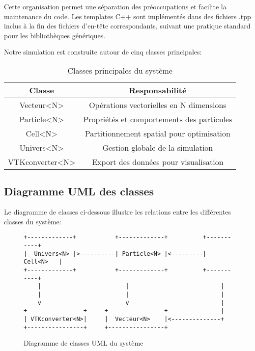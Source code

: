\documentclass[12pt,a4paper]{article}
\begin{document}
Cette organisation permet une séparation des préoccupations et facilite la maintenance du code. Les templates C++ sont implémentés dans des fichiers .tpp inclus à la fin des fichiers d'en-tête correspondants, suivant une pratique standard pour les bibliothèques génériques.

Notre simulation est construite autour de cinq classes principales:

\begin{table}[H]
\centering
\begin{tabular}{|c|c|}
\hline
\textbf{Classe} & \textbf{Responsabilité} \\
\hline
Vecteur<N> & Opérations vectorielles en N dimensions \\
\hline
Particle<N> & Propriétés et comportements des particules \\
\hline
Cell<N> & Partitionnement spatial pour optimisation \\
\hline
Univers<N> & Gestion globale de la simulation \\
\hline
VTKconverter<N> & Export des données pour visualisation \\
\hline
\end{tabular}
\caption{Classes principales du système}
\end{table}

\subsection{Diagramme UML des classes}

Le diagramme de classes ci-dessous illustre les relations entre les différentes classes du système:

\begin{figure}[H]
\centering
\begin{minipage}{\textwidth}
\begin{verbatim}
+-------------+           +-------------+          +-----------+
|  Univers<N> |>----------| Particle<N> |<---------| Cell<N>   |
+-------------+           +-------------+          +-----------+
    |                        |                          |
    |                        |                          |
    v                        v                          |
+----------------+     +----------------+               |
| VTKconverter<N>|     |  Vecteur<N>    |<--------------+
+----------------+     +----------------+
\end{verbatim}
\end{minipage}
\caption{Diagramme de classes UML du système}
\end{figure}
\end{document}
